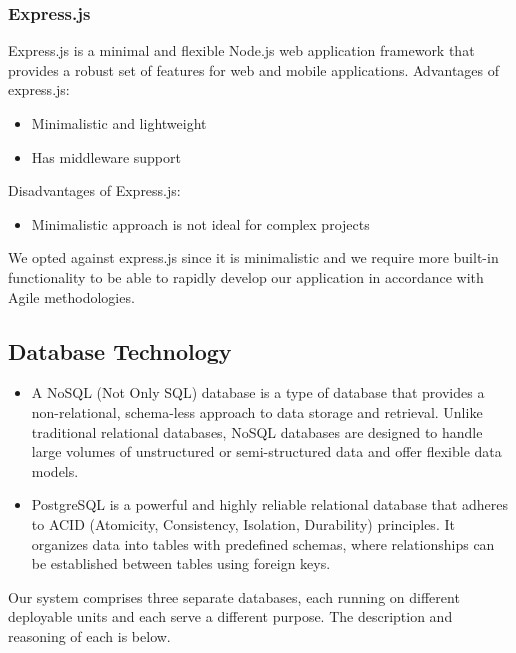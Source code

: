 \documentclass[12pt]{article}
\begin{document}
\subsubsection{Express.js}
Express.js is a minimal and flexible Node.js web application framework that provides a robust set of features for web and mobile applications.
Advantages of express.js:
\begin{itemize}
    \item Minimalistic and lightweight
    \item Has middleware support
\end{itemize}
Disadvantages of Express.js:
\begin{itemize}
    \item Minimalistic approach is not ideal for complex projects
\end{itemize}
We opted against express.js since it is minimalistic and we require more built-in functionality to be able to rapidly develop our application in accordance with Agile methodologies.
\subsection{Database Technology}
\begin{itemize}
    \item A NoSQL (Not Only SQL) database is a type of database that provides a non-relational, schema-less approach to data storage and retrieval. Unlike traditional relational databases, NoSQL databases are designed to handle large volumes of unstructured or semi-structured data and offer flexible data models.
    \item PostgreSQL is a powerful and highly reliable relational database that adheres to ACID (Atomicity, Consistency, Isolation, Durability) principles. It organizes data into tables with predefined schemas, where relationships can be established between tables using foreign keys.
\end{itemize}
Our system comprises three separate databases, each running on different deployable units and each serve a different purpose. The description and reasoning of each is below.
\end{document}
